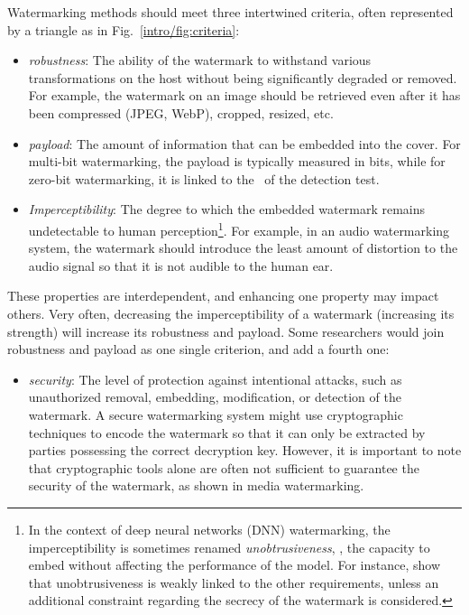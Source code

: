 Watermarking methods should meet three intertwined criteria, often represented by a triangle as in Fig.~\ref{intro/fig:criteria}:
\begin{itemize}
    \item \emph{\Gls*{robustness}}: 
    The ability of the watermark to withstand various transformations on the host without being significantly degraded or removed. 
    For example, the watermark on an image should be retrieved even after it has been compressed (JPEG, WebP), cropped, resized, etc.
    \item \emph{\Gls*{payload}}: 
    The amount of information that can be embedded into the cover. 
    For multi-bit watermarking, the payload is typically measured in bits, while for zero-bit watermarking, it is linked to the \pval\ of the detection test.
    \item \emph{Imperceptibility}: 
    The degree to which the embedded watermark remains undetectable to human perception\footnote{
        In the context of deep neural networks (DNN) watermarking, the imperceptibility is sometimes renamed \emph{unobtrusiveness}, \ie, the capacity to embed without affecting the performance of the model.
        For instance, \citet{tondi2024robust} show that unobtrusiveness is weakly linked to the other requirements, unless an additional constraint regarding the secrecy of the watermark is considered.
        }.
    For example, in an audio watermarking system, the watermark should introduce the least amount of distortion to the audio signal so that it is not audible to the human ear.
\end{itemize}
These properties are interdependent, and enhancing one property may impact others. 
Very often, decreasing the imperceptibility of a watermark (increasing its strength) will increase its robustness and payload.
Some researchers would join robustness and payload as one single criterion, and add a fourth one:
\begin{itemize}
    \item \emph{\Gls*{security}}: 
    The level of protection against intentional attacks, such as unauthorized removal, embedding, modification, or detection of the watermark.
    A secure watermarking system might use cryptographic techniques to encode the watermark so that it can only be extracted by parties possessing the correct decryption key. 
    However, it is important to note that cryptographic tools alone are often not sufficient to guarantee the security of the watermark, as shown in media watermarking.
\end{itemize}


